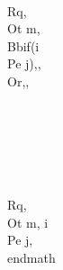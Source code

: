 \\Rq, \\Ot m, \\Bb{if(i \\Pe j)}{,}{,\\Or,}, \\\\\\\\\\\\
\\Rq, \\Ot m, i \\Pe j, 
\\end{math}


\\[, i \\Pe j, \\Og m, \\Rq , \\Og m, i \\Pe j,\\]

\\[, i \\Pe j, m \\Oc n, \\Rq , m \\Oc n, i \\Pe j,\\]
\\[, i \\Pe j, m \\Od n, \\Rq , m \\Od n, i \\Pe j,\\]
\\[, i \\Pe j, m \\Ob n, \\Rq , m \\Ob n, i \\Pe j,\\]

\\[, i \\Pe j, m \\Os, \\Rq , m \\Os, i \\Pe j,\\]
\\[, i \\Pe j, m \\On, \\Rq , m \\On, i \\Pe j,\\]
\\[, i \\Pe j, m \\Op, \\Rq , m \\Op, i \\Pe j,\\]

